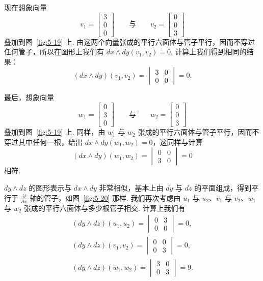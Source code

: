 现在想象向量
\[
v_1=\begin{bmatrix}3\\0\\0\end{bmatrix}\qquad\text{与}\qquad v_2=\begin{bmatrix}0\\0\\3\end{bmatrix}
\]
叠加到图~\ref{fig:5-19} 上. 由这两个向量张成的平行六面体与管子平行，因而不穿过任何管子，所以在图形上我们有 $dx\wedge dy(v_1,v_2)=0$. 计算上我们得到相同的结果：
\[
(dx\wedge dy)(v_1,v_2)=
\begin{vmatrix}
3 & 0\\
0 & 0
\end{vmatrix}
=0.
\]

最后，想象向量
\[
w_1=\begin{bmatrix}0\\3\\0\end{bmatrix}\qquad\text{与}\qquad w_2=\begin{bmatrix}0\\0\\3\end{bmatrix}
\]
叠加到图~\ref{fig:5-19} 上. 同样，由 $w_1$ 与 $w_2$ 张成的平行六面体与管子平行，因而不穿过其中任何一根，给出 $dx\wedge dy(w_1,w_2)=0$，这同样与计算
\[
(dx\wedge dy)(w_1,w_2)=
\begin{vmatrix}
0 & 0\\
3 & 0
\end{vmatrix}
=0
\]
相符.

$dy\wedge dz$ 的图形表示与 $dx\wedge dy$ 非常相似，基本上由 $dy$ 与 $dz$ 的平面组成，得到平行于 $\frac{\partial}{\partial x}$ 轴的管子，如图~\ref{fig:5-20} 那样. 我们再次考虑由 $u_1$ 与 $u_2$、$v_1$ 与 $v_2$、$w_1$ 与 $w_2$ 张成的平行六面体与多少根管子相交. 计算上我们有
\begin{align*}
(dy\wedge dz)(u_1,u_2)=
\begin{vmatrix}
0 & 3\\
0 & 0
\end{vmatrix}
=0, \\
(dy\wedge dz)(v_1,v_2)=
\begin{vmatrix}
0 & 0\\
0 & 3
\end{vmatrix}
=0, \\
(dy\wedge dz)(w_1,w_2)=
\begin{vmatrix}
3 & 0\\
0 & 3
\end{vmatrix}
=9.
\end{align*}

